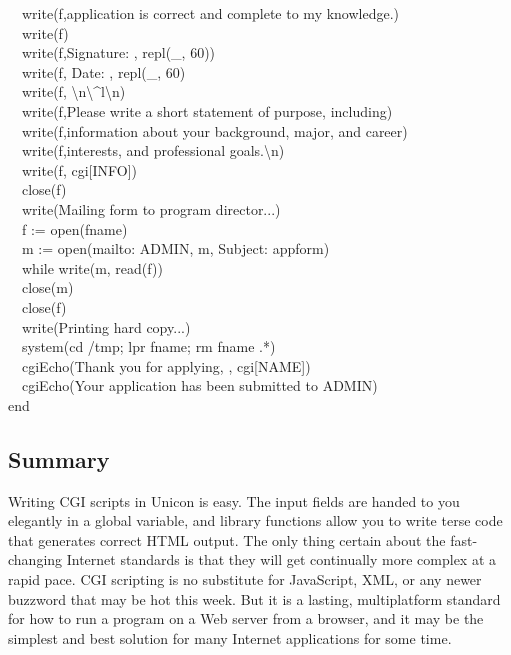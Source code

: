 {\ \ write(f,{\textquotedbl}application is correct and complete to my
knowledge.{\textquotedbl}) \\
\ \ write(f) \\
\ \ write(f,{\textquotedbl}Signature: {\textquotedbl},
repl({\textquotedbl}\_{\textquotedbl}, 60)) \\
\ \ write(f,{\textquotedbl} Date: {\textquotedbl},
repl({\textquotedbl}\_{\textquotedbl}, 60) \\
\ \ write(f,
{\textquotedbl}{\textbackslash}n{\textbackslash}\^{}l{\textbackslash}n{\textquotedbl}) \\
\ \ write(f,{\textquotedbl}Please write a short statement of purpose,
including{\textquotedbl}) \\
\ \ write(f,{\textquotedbl}information about your background, major, and
career{\textquotedbl}) \\
\ \ write(f,{\textquotedbl}interests, and professional
goals.{\textbackslash}n{\textquotedbl}) \\
\ \ write(f, cgi[{\textquotedbl}INFO{\textquotedbl}]) \\
\ \ close(f) \\
\ \ write({\textquotedbl}Mailing form to program director...{\textquotedbl}) \\
\ \ f := open(fname) \\
\ \ m := open({\textquotedbl}mailto:{\textquotedbl} {\textbar}{\textbar}
ADMIN, {\textquotedbl}m{\textquotedbl}, {\textquotedbl}Subject:
appform{\textquotedbl}) \\
\ \ while write(m, read(f)) \\
\ \ close(m) \\
\ \ close(f) \\
\ \ write({\textquotedbl}Printing hard copy...{\textquotedbl}) \\
\ \ system({\textquotedbl}cd /tmp; lpr {\textquotedbl}
{\textbar}{\textbar} fname; rm {\textquotedbl} {\textbar}{\textbar}
fname {\textbar}{\textbar} {\textquotedbl}.*{\textquotedbl}) \\
\ \ cgiEcho({\textquotedbl}Thank you for applying, {\textquotedbl},
cgi[{\textquotedbl}NAME{\textquotedbl}]) \\
\ \ cgiEcho({\textquotedbl}Your application has been submitted to
{\textquotedbl} {\textbar}{\textbar} ADMIN) \\
end
}

\subsection{Summary}

Writing CGI scripts in Unicon is easy. The input fields are handed to
you elegantly in a global variable, and library functions allow you to
write terse code that generates correct HTML output. The only thing
certain about the fast-changing Internet standards is that they will
get continually more complex at a rapid pace. CGI scripting is no
substitute for JavaScript, XML, or any
newer buzzword that may be hot this week. But it is a lasting,
multiplatform standard for how to run a program on a Web server from a
browser, and it may be the simplest and best solution for many Internet
applications for some time.
